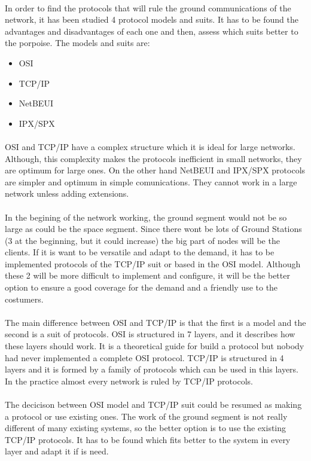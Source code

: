 \paragraph{}
In order to find the protocols that will rule the ground communications of the network, it has been studied 4 protocol models and suits. It has to be found the advantages and disadvantages of each one and then, assess which suits better to the porpoise. The models and suits are:
\begin{itemize}
\item OSI
\item TCP/IP
\item NetBEUI
\item IPX/SPX
\end{itemize}
\paragraph{} 
OSI and TCP/IP have a complex structure which it is ideal for large networks. Although, this complexity makes the protocols inefficient in small networks, they are optimum for large ones. On the other hand NetBEUI and IPX/SPX protocols are simpler and optimum in simple comunications. They cannot work in a large network unless adding extensions. 
\paragraph{}
In the begining of the network working, the ground segment would not be so large as could be the space segment. Since there wont be lots of Ground Stations (3 at the beginning, but it could increase) the big part of nodes will be the clients. If it is want to be versatile and adapt to the demand, it has to be implemented protocols of the TCP/IP suit or based in the OSI model. Although these 2 will be more difficult to implement and configure, it will be the better option to ensure a good coverage for the demand and a friendly use to the costumers.
\paragraph{}
The main difference between OSI and TCP/IP is that the first is a model and the second is a suit of protocols. OSI is structured in 7 layers, and it describes how these layers should work. It is a theoretical guide for build a protocol but nobody had never implemented a complete OSI protocol. TCP/IP is structured in 4 layers and it is formed by a family of protocols which can be used in this layers. In the practice almost every network is ruled by TCP/IP protocols. 
\paragraph{}
The decicison between OSI model and TCP/IP suit could be resumed as making a protocol or use existing ones. The work of the ground segment is not really different of many existing systems, so the better option is to use the existing TCP/IP protocols. It has to be found which fits better to the system in every layer and adapt it if is need.

